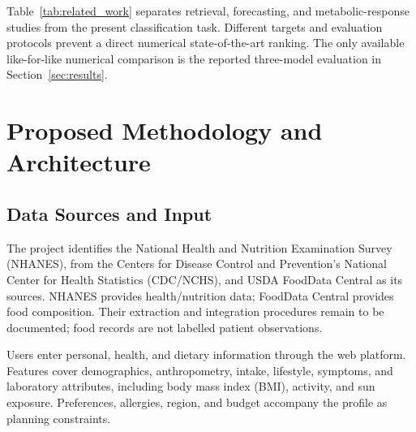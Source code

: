 \documentclass[conference]{IEEEtran}
\begin{document}
Table~\ref{tab:related_work} separates retrieval, forecasting, and metabolic-response studies from the present classification task. Different targets and evaluation protocols prevent a direct numerical state-of-the-art ranking. The only available like-for-like numerical comparison is the reported three-model evaluation in Section~\ref{sec:results}.

\section{Proposed Methodology and Architecture}

\subsection{Data Sources and Input}
The project identifies the National Health and Nutrition Examination Survey (NHANES), from the Centers for Disease Control and Prevention's National Center for Health Statistics (CDC/NCHS), and USDA FoodData Central as its sources. NHANES provides health/nutrition data; FoodData Central provides food composition. Their extraction and integration procedures remain to be documented; food records are not labelled patient observations.

Users enter personal, health, and dietary information through the web platform. Features cover demographics, anthropometry, intake, lifestyle, symptoms, and laboratory attributes, including body mass index (BMI), activity, and sun exposure. Preferences, allergies, region, and budget accompany the profile as planning constraints.
\end{document}
